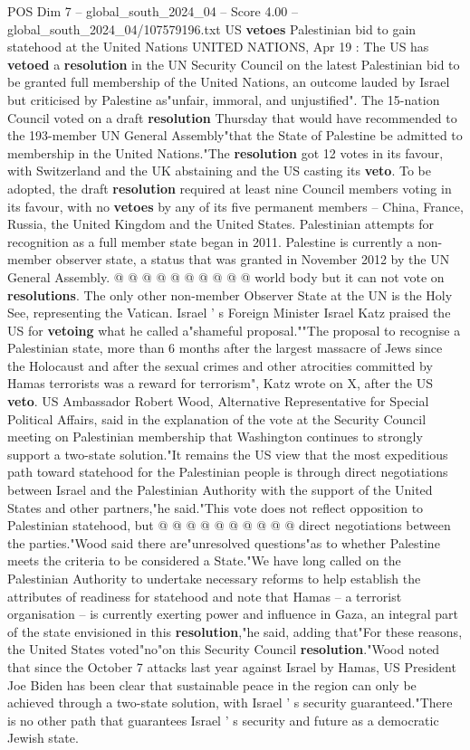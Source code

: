 \begin{textsample}{POS Dim 7 – global\_south\_2024\_04 – Score 4.00 – global\_south\_2024\_04/107579196.txt}  \label{ex:f7_pos_100}
US \textbf{vetoes} Palestinian bid to gain statehood at the United Nations UNITED NATIONS, Apr 19 : The US has \textbf{vetoed} a \textbf{resolution} in the UN Security Council on the latest Palestinian bid to be granted full membership of the United Nations, an outcome lauded by Israel but criticised by Palestine as"unfair, immoral, and unjustified".
The 15-nation Council voted on a draft \textbf{resolution} Thursday that would have recommended to the 193-member UN General Assembly"that the State of Palestine be admitted to membership in the United Nations."The \textbf{resolution} got 12 votes in its favour, with Switzerland and the UK abstaining and the US casting its \textbf{veto}.
To be adopted, the draft \textbf{resolution} required at least nine Council members voting in its favour, with no \textbf{vetoes} by any of its five permanent members -- China, France, Russia, the United Kingdom and the United States.
Palestinian attempts for recognition as a full member state began in 2011.
Palestine is currently a non-member observer state, a status that was granted in November 2012 by the UN General Assembly. @ @ @ @ @ @ @ @ @ @ world body but it can not vote on \textbf{resolutions}.
The only other non-member Observer State at the UN is the Holy See, representing the Vatican.
Israel ' s Foreign Minister Israel Katz praised the US for \textbf{vetoing} what he called a"shameful proposal.""The proposal to recognise a Palestinian state, more than 6 months after the largest massacre of Jews since the Holocaust and after the sexual crimes and other atrocities committed by Hamas terrorists was a reward for terrorism", Katz wrote on X, after the US \textbf{veto}.
US Ambassador Robert Wood, Alternative Representative for Special Political Affairs, said in the explanation of the vote at the Security Council meeting on Palestinian membership that Washington continues to strongly support a two-state solution."It remains the US view that the most expeditious path toward statehood for the Palestinian people is through direct negotiations between Israel and the Palestinian Authority with the support of the United States and other partners,"he said."This vote does not reflect opposition to Palestinian statehood, but @ @ @ @ @ @ @ @ @ @ direct negotiations between the parties."Wood said there are"unresolved questions"as to whether Palestine meets the criteria to be considered a State."We have long called on the Palestinian Authority to undertake necessary reforms to help establish the attributes of readiness for statehood and note that Hamas -- a terrorist organisation -- is currently exerting power and influence in Gaza, an integral part of the state envisioned in this \textbf{resolution},"he said, adding that"For these reasons, the United States voted"no"on this Security Council \textbf{resolution}."Wood noted that since the October 7 attacks last year against Israel by Hamas, US President Joe Biden has been clear that sustainable peace in the region can only be achieved through a two-state solution, with Israel ' s security guaranteed."There is no other path that guarantees Israel ' s security and future as a democratic Jewish state.

\end{textsample}
